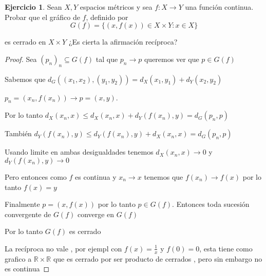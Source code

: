 \documentclass[12pt]{article}
\newcommand{\R}{\mathbb{R}}
\newcommand{\ra}{\rightarrow}
\theoremstyle{definition}
\newtheorem{ej}{Ejercicio}
\begin{document}
 \begin{ej}
   Sean $X,Y$ espacios métricos y sea $f: X \ra Y$ una función continua. Probar que el gráfico de $f$, definido por 
   $$G(f) = \{(x,f(x)) \in X \times Y : x \in X \}$$

   es cerrado en $X \times Y$ ¿Es cierta la afirmación recíproca?

   \begin{proof}
     Sea $(p_n)_n \subseteq G(f)$ tal que $p_n \ra p$ queremos ver que $p \in G(f)$


     Sabemos que $d_G((x_1,x_2),(y_1,y_2)) = d_X(x_1,y_1) + d_Y(x_2,y_2)$

     
     $p_n = (x_n,f(x_n)) \ra p = (x,y)$. 

     Por lo tanto $d_X(x_n,x) \leq d_X(x_n,x) + d_Y(f(x_n),y) = d_G(p_n , p)$

     También $d_Y(f(x_n),y) \leq d_Y(f(x_n),y) + d_X(x_n,x) = d_G(p_n,p)$

     Usando limite en ambas desigualdades tenemos $d_X(x_n,x) \ra 0$ y $d_Y(f(x_n),y) \ra 0$

     Pero entonces como $f$ es continua y $x_n \ra x$ tenemos que $f(x_n) \ra f(x)$ por lo tanto $f(x) = y$

     Finalmente $p=(x,f(x))$ por lo tanto $p \in G(f)$. Entonces toda sucesión convergente de $G(f)$ converge en $G(f)$

     Por lo tanto $G(f)$ es cerrado

     La recíproca no vale , por ejempl con $f(x) = \frac{1}{x}$ y $f(0) = 0$, esta tiene como grafico a $\R \times \R$ que es cerrado por ser producto de cerrados , pero sin embargo no es continua
   \end{proof}
 \end{ej}
 \newpage
\end{document}

